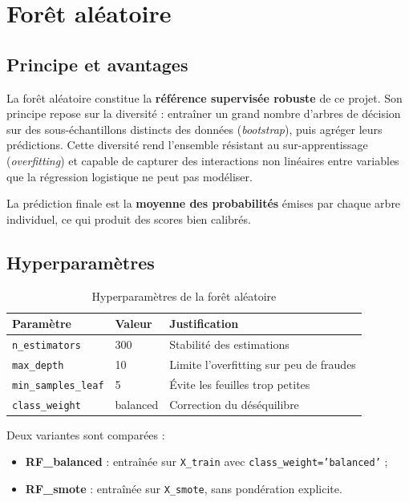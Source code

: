 \section{Forêt aléatoire}

\subsection{Principe et avantages}

La forêt aléatoire constitue la \textbf{référence supervisée robuste} de ce projet. Son
principe repose sur la diversité : entraîner un grand nombre d'arbres de décision sur des
sous-échantillons distincts des données (\textit{bootstrap}), puis agréger leurs
prédictions. Cette diversité rend l'ensemble résistant au sur-apprentissage
(\textit{overfitting}) et capable de capturer des interactions non linéaires entre variables
que la régression logistique ne peut pas modéliser.

La prédiction finale est la \textbf{moyenne des probabilités} émises par chaque arbre
individuel, ce qui produit des scores bien calibrés.

\subsection{Hyperparamètres}

\begin{table}[H]
\centering
\caption{Hyperparamètres de la forêt aléatoire}
\label{tab:rf_params}
\begin{tabular}{lll}
\toprule
\textbf{Paramètre} & \textbf{Valeur} & \textbf{Justification} \\
\midrule
\texttt{n\_estimators}      & 300 & Stabilité des estimations \\
\texttt{max\_depth}         & 10  & Limite l'overfitting sur peu de fraudes \\
\texttt{min\_samples\_leaf} & 5   & Évite les feuilles trop petites \\
\texttt{class\_weight}      & balanced & Correction du déséquilibre \\
\bottomrule
\end{tabular}
\end{table}

Deux variantes sont comparées :
\begin{itemize}
  \item \textbf{RF\_balanced} : entraînée sur \texttt{X\_train} avec
    \texttt{class\_weight='balanced'} ;
  \item \textbf{RF\_smote} : entraînée sur \texttt{X\_smote}, sans pondération explicite.
\end{itemize}

